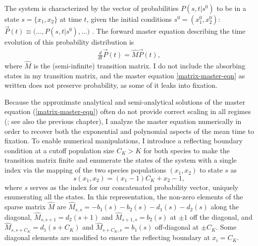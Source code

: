 The system is characterized by the vector of probabilities $P(s,t|s^0)$ to be in a state $s=\{x_1,x_2\}$ at time $t$, given the initial conditions $s^0=(x_1^{0},x_2^{0})$: $\vec{P}(t)\equiv\big(\dots,P(s,t|s^0),\dots \big)$ \cite{Munsky2006}. 
The forward master equation describing the time evolution of this probability distribution is \cite{VanKampen1992}
\begin{align} \label{matrix-master-eqn}
\frac{d}{dt}\vec{P}(t) = \hat{M}\vec{P}(t),
\end{align}
where $\hat{M}$ is the (semi-infinite) transition matrix. %
I do not include the absorbing states in my transition matrix, and the master equation \ref{matrix-master-eqn} as written does not preserve probability, as some of it leaks into fixation. 

Because the approximate analytical and semi-analytical solutions of the master equation (\ref{matrix-master-eqn}) often do not provide correct scaling in all regimes (\cite{Grasman1983,Doering2005,Assaf2016,Badali2019b}; see also the previous chapter), I analyze the master equation numerically in order to recover both the exponential and polynomial aspects of the mean time to fixation. 
To enable numerical manipulations, I introduce a reflecting boundary condition at a cutoff population size $C_K>K$ for both species to make the transition matrix finite \cite{Munsky2006,Cao2016} and enumerate the states of the system with a single index \cite{Munsky2006} via the mapping of the two species populations $(x_1,x_2)$ to state $s$ as
\begin{equation}
s(x_1,x_2) = (x_1-1)C_K+x_2-1,
\end{equation}
where $s$ serves as the index for our concatenated probability vector, uniquely enumerating all the states. 
In this representation, the non-zero elements of the sparse matrix $\hat{M}$ are $\hat{M}_{s,s}=-b_1(s)-b_2(s)-d_1(s)-d_2(s)$ along the diagonal, $\hat{M}_{s,s+1}=d_2(s+1)$ and $\hat{M}_{s+1,s}=b_2(s)$ at $\pm 1$ off the diagonal, and $\hat{M}_{s,s+C_K}=d_1(s+C_K)$ and $\hat{M}_{s+C_K,s}=b_1(s)$ off-diagonal at $\pm C_K$. 
Some diagonal elements are modified to ensure the reflecting boundary at $x_i=C_K$. 


